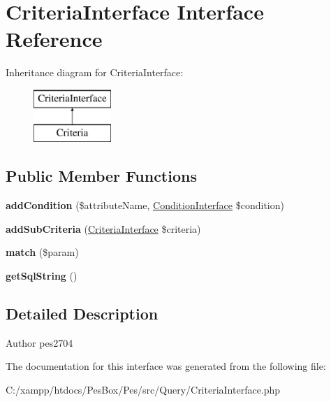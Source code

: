 \hypertarget{interface_pes_1_1_query_1_1_criteria_interface}{}\section{Criteria\+Interface Interface Reference}
\label{interface_pes_1_1_query_1_1_criteria_interface}
Inheritance diagram for Criteria\+Interface\+:\begin{figure}[H]
\begin{center}
\leavevmode
\includegraphics[height=2.000000cm]{interface_pes_1_1_query_1_1_criteria_interface}
\end{center}
\end{figure}
\subsection*{Public Member Functions}
\begin{DoxyCompactItemize}
\item 
\mbox{\label{interface_pes_1_1_query_1_1_criteria_interface_a7d83ab6f13d502a4fafc804c9de53b4c}} 
{\bfseries add\+Condition} (\$attribute\+Name, \mbox{\hyperlink{interface_pes_1_1_query_1_1_condition_interface}{Condition\+Interface}} \$condition)
\item 
\mbox{\label{interface_pes_1_1_query_1_1_criteria_interface_a3697aeefe7651a9562610226469c179c}} 
{\bfseries add\+Sub\+Criteria} (\mbox{\hyperlink{interface_pes_1_1_query_1_1_criteria_interface}{Criteria\+Interface}} \$criteria)
\item 
\mbox{\label{interface_pes_1_1_query_1_1_criteria_interface_a0ea3a331d62120fbb62ce360ca8198f0}} 
{\bfseries match} (\$param)
\item 
\mbox{\label{interface_pes_1_1_query_1_1_criteria_interface_a60f88a13135803a03975ff6555ece43f}} 
{\bfseries get\+Sql\+String} ()
\end{DoxyCompactItemize}


\subsection{Detailed Description}
\begin{DoxyAuthor}{Author}
pes2704 
\end{DoxyAuthor}


The documentation for this interface was generated from the following file\+:\begin{DoxyCompactItemize}
\item 
C\+:/xampp/htdocs/\+Pes\+Box/\+Pes/src/\+Query/Criteria\+Interface.\+php\end{DoxyCompactItemize}
